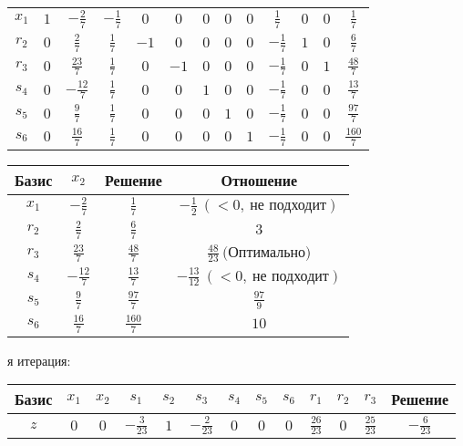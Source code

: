 \documentclass{article}%
\begin{document}
\begin{flushleft}
\begin{tabular}{|c|ccccccccccc|c|}
\hline%
$x_{1}$&$1$&$-\frac{2}{7}$&$-\frac{1}{7}$&$0$&$0$&$0$&$0$&$0$&$\frac{1}{7}$&$0$&$0$&$\frac{1}{7}$\\%
$r_{2}$&$0$&$\frac{2}{7}$&$\frac{1}{7}$&$-1$&$0$&$0$&$0$&$0$&$-\frac{1}{7}$&$1$&$0$&$\frac{6}{7}$\\%
$r_{3}$&$0$&$\frac{23}{7}$&$\frac{1}{7}$&$0$&$-1$&$0$&$0$&$0$&$-\frac{1}{7}$&$0$&$1$&$\frac{48}{7}$\\%
$s_{4}$&$0$&$-\frac{12}{7}$&$\frac{1}{7}$&$0$&$0$&$1$&$0$&$0$&$-\frac{1}{7}$&$0$&$0$&$\frac{13}{7}$\\%
$s_{5}$&$0$&$\frac{9}{7}$&$\frac{1}{7}$&$0$&$0$&$0$&$1$&$0$&$-\frac{1}{7}$&$0$&$0$&$\frac{97}{7}$\\%
$s_{6}$&$0$&$\frac{16}{7}$&$\frac{1}{7}$&$0$&$0$&$0$&$0$&$1$&$-\frac{1}{7}$&$0$&$0$&$\frac{160}{7}$\\%
\hline%
\end{tabular}%
\newline%
\newline%
\newline%
\begin{tabular}{|cccc|}%
\hline%
Базис&$x_{2}$&Решение&Отношение\\%
\hline%
$x_{1}$&$-\frac{2}{7}$&$\frac{1}{7}$&$-\frac{1}{2}\: (< 0, \: \text{не подходит})$\\%
$r_{2}$&$\frac{2}{7}$&$\frac{6}{7}$&$3$\\%
$r_{3}$&$\frac{23}{7}$&$\frac{48}{7}$&$\frac{48}{23}\: \text{(Оптимально)}$\\%
$s_{4}$&$-\frac{12}{7}$&$\frac{13}{7}$&$-\frac{13}{12}\: (< 0, \: \text{не подходит})$\\%
$s_{5}$&$\frac{9}{7}$&$\frac{97}{7}$&$\frac{97}{9}$\\%
$s_{6}$&$\frac{16}{7}$&$\frac{160}{7}$&$10$\\%
\hline%
\end{tabular}%
\newline%
\newline%
я итерация: %
\newline%
\newline%
\renewcommand{\arraystretch}{1.3}%
\begin{tabular}{|c|ccccccccccc|c|}%
\hline%
Базис&$x_{1}$&$x_{2}$&$s_{1}$&$s_{2}$&$s_{3}$&$s_{4}$&$s_{5}$&$s_{6}$&$r_{1}$&$r_{2}$&$r_{3}$&Решение\\%
\hline%
$z$&$0$&$0$&$-\frac{3}{23}$&$1$&$-\frac{2}{23}$&$0$&$0$&$0$&$\frac{26}{23}$&$0$&$\frac{25}{23}$&$-\frac{6}{23}$\\%

\end{tabular}
\end{flushleft}
\end{document}
